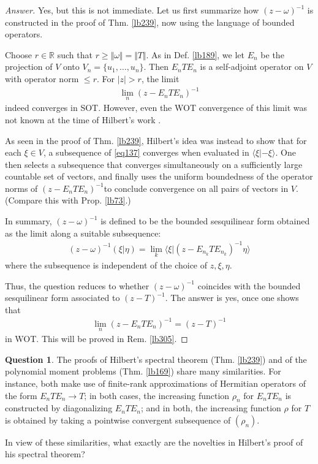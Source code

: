 \documentclass[12pt,b5paper,notitlepage]{article}
\theoremstyle{definition}
\newtheorem{question}[df]{Question}
\theoremstyle{plain}
\newcommand{\bk}[1]{\langle {#1}\rangle}
\newcommand{\Rbb}{\mathbb R}
\numberwithin{equation}{section}
\begin{document}
\begin{proof}[Answer]
Yes, but this is not immediate. Let us first summarize how $(z-\omega)^{-1}$ is constructed in the proof of Thm. \ref{lb239}, now using the language of bounded operators.

Choose $r\in\Rbb$ such that $r\geq\Vert\omega\Vert=\Vert T\Vert$. As in Def. \ref{lb189}, we let $E_n$ be the projection of $V$ onto $V_n=\{u_1,\dots,u_n\}$. Then $E_nTE_n$ is a self-adjoint operator on $V$ with operator norm $\leq r$. For $|z|>r$, the limit
\begin{align}\label{eq137}
\lim_n (z-E_nTE_n)^{-1}
\end{align}
indeed converges in SOT. However, even the WOT convergence of this limit was not known at the time of Hilbert's work \cite{Hil06}. 

As seen in the proof of Thm. \ref{lb239}, Hilbert's idea was instead to show that for each $\xi\in V$, a subsequence of \eqref{eq137} converges when evaluated in $\bk{\xi|-\xi}$. One then selects a subsequence that converges simultaneously on a sufficiently large countable set of vectors, and finally uses the uniform boundedness of the operator norms of $(z-E_nTE_n)^{-1}$to conclude convergence on all pairs of vectors in $V$. (Compare this with Prop. \ref{lb73}.)

In summary, $(z-\omega)^{-1}$ is defined to be the bounded sesquilinear form obtained as the limit along a suitable subsequence:
\begin{align}
(z-\omega)^{-1}(\xi|\eta)=\lim_k \bk{\xi|(z-E_{n_k}TE_{n_k})^{-1}\eta}
\end{align}
where the subsequence is independent of the choice of $z,\xi,\eta$.

Thus, the question reduces to whether $(z-\omega)^{-1}$ coincides with the bounded sesquilinear form associated to $(z-T)^{-1}$. The answer is yes, once one shows that
\begin{align}
\lim_n (z-E_nTE_n)^{-1}=(z-T)^{-1}
\end{align}
in WOT. This will be proved in Rem. \ref{lb305}.
\end{proof}




\begin{question}\label{lb243}
The proofs of Hilbert's spectral theorem (Thm. \ref{lb239}) and of the polynomial moment problems (Thm. \ref{lb169}) share many similarities. For instance, both make use of finite-rank approximations of Hermitian operators of the form $E_nTE_n\rightarrow T$; in both cases, the increasing function $\rho_n$ for $E_nTE_n$ is constructed by diagonalizing $E_nTE_n$; and in both, the increasing function $\rho$ for $T$ is obtained by taking a pointwise convergent subsequence of $(\rho_n)$. 

In view of these similarities, what exactly are the novelties in Hilbert’s proof of his spectral theorem?
\end{question}
\end{document}
